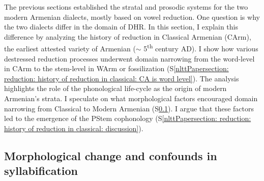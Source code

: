 The previous sections established the stratal and prosodic systems for the two modern Armenian dialects, mostly based on vowel reduction. One question is why the two dialects differ in the domain of DHR. In this section, I explain this difference by analyzing the history of reduction in Classical Armenian (CArm), the earliest attested variety of Armenian ($\sim$ 5\textsuperscript{th} century AD). I show how various destressed reduction processes underwent domain narrowing from the word-level in CArm to the stem-level in WArm or fossilization (S\ref{nlttPapersection: reduction: history of reduction in classical: CA is word level}). The analysis highlights the role of the phonological life-cycle as the origin of modern Armenian's strata. I speculate on what morphological factors encouraged domain narrowing from Classical to Modern Armenian (S\ref{nlttPapersection: reduction: history of reduction in classical: change}). I argue that these factors led to the emergence of the PStem cophonology (S\ref{nlttPapersection: reduction: history of reduction in classical: discussion}).%









\subsection{Morphological change and confounds in syllabification}\label{nlttPapersection: reduction: history of reduction in classical: change}

